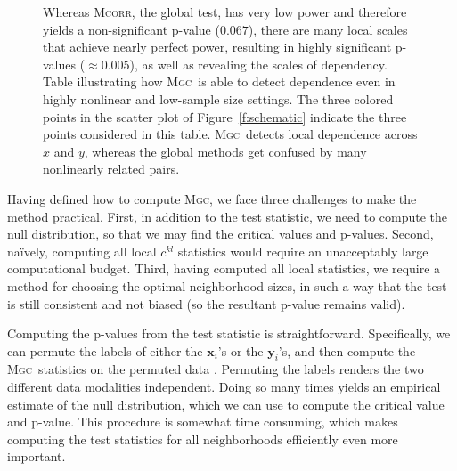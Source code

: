 \documentclass[11pt]{article}
\providecommand{\sct}[1]{{\normalfont\textsc{#1}}}
\providecommand{\mb}[1]{\boldsymbol{#1}}
\providecommand{\mc}[1]{\mathcal{#1}}
\newcommand{\G}{c}
\newcommand{\Mgc}{\sct{Mgc}}
\newcommand{\Mcorr}{\sct{Mcorr}}
\begin{document}
\begin{figure}[htbp]
{%
Whereas \Mcorr, the global test, has very low power and therefore yields a non-significant p-value ($0.067$),  there are many local scales that achieve nearly perfect power, resulting in highly significant p-values ($\approx 0.005$), as well as revealing the scales of dependency. Table illustrating how \Mgc~is able to detect dependence even in highly nonlinear and low-sample size settings. The three colored points in the scatter plot of Figure~\ref{f:schematic} indicate the three points considered in this table. \Mgc~detects local dependence across $x$ and $y$, whereas the global methods get confused by many nonlinearly related pairs.}
\end{figure}
\clearpage



\clearpage
Having defined how to compute \Mgc, we face three challenges to make the method practical. First, in addition to the test statistic, we need to compute the null distribution, so that we may find the critical values and p-values.
Second, na\"ively, computing all local $\G^{kl}$ statistics would require an unacceptably large computational budget.
Third, having computed all local statistics, we require a method for choosing the optimal neighborhood sizes, in such a way that the test is still consistent and not biased (so the resultant p-value remains valid).

Computing the p-values from the test statistic is  straightforward.
Specifically, we can permute the labels of either the $\mb{x}_i$'s or the $\mb{y}_i$'s, and then compute the \Mgc~statistics on the permuted data \cite{GoodPermutationBook}.  Permuting the labels renders the two different data modalities  independent.  Doing so many times yields an empirical estimate of the null distribution, which we can use to compute the critical value and p-value. This procedure is somewhat time consuming, which makes computing the test statistics for all neighborhoods efficiently even more important.

\end{document}

